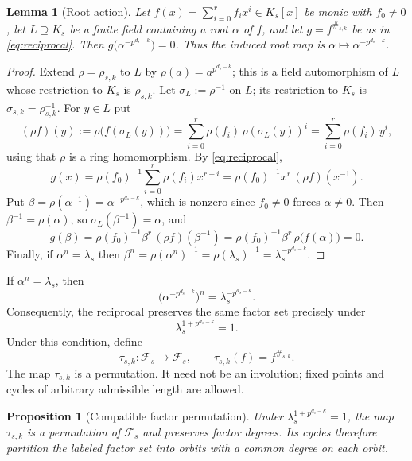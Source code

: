\documentclass[10pt,a4paper]{article}
\newcommand{\Fs}{\mathcal F_s}
\numberwithin{equation}{section}
\theoremstyle{plain}
\newtheorem{lemma}[theorem]{Lemma}
\newtheorem{proposition}[theorem]{Proposition}
\theoremstyle{definition}
\theoremstyle{remark}
\begin{document}
\begin{lemma}[Root action]\label{lem:root-action}
Let $f(x)=\sum_{i=0}^{r}f_ix^{i}\in K_s[x]$ be monic with $f_0\neq0$, let
$L\supseteq K_s$ be a finite field containing a root $\alpha$ of $f$, and let
$g=f^{\#_{s,k}}$ be as in \eqref{eq:reciprocal}. Then
$g\bigl(\alpha^{-p^{d_s-k}}\bigr)=0$. Thus the induced root map is
$\alpha\mapsto\alpha^{-p^{d_s-k}}$.
\end{lemma}

\begin{proof}
Extend $\rho=\rho_{s,k}$ to $L$ by $\rho(a)=a^{p^{d_s-k}}$; this is a field
automorphism of $L$ whose restriction to $K_s$ is $\rho_{s,k}$. Let
$\sigma_L:=\rho^{-1}$ on $L$; its restriction to $K_s$ is
$\sigma_{s,k}=\rho_{s,k}^{-1}$. For $y\in L$ put
\[
(\rho f)(y):=\rho\bigl(f(\sigma_L(y))\bigr)
 =\sum_{i=0}^{r}\rho(f_i)\,\rho(\sigma_L(y))^{i}
 =\sum_{i=0}^{r}\rho(f_i)\,y^{i},
\]
using that $\rho$ is a ring homomorphism. By \eqref{eq:reciprocal},
\[
g(x)=\rho(f_0)^{-1}\sum_{i=0}^{r}\rho(f_i)x^{r-i}
 =\rho(f_0)^{-1}x^{r}\,(\rho f)(x^{-1}).
\]
Put $\beta=\rho(\alpha^{-1})=\alpha^{-p^{d_s-k}}$, which is nonzero since
$f_0\ne0$ forces $\alpha\ne0$. Then $\beta^{-1}=\rho(\alpha)$, so
$\sigma_L(\beta^{-1})=\alpha$, and
\[
g(\beta)=\rho(f_0)^{-1}\beta^{r}\,(\rho f)(\beta^{-1})
 =\rho(f_0)^{-1}\beta^{r}\,\rho\bigl(f(\alpha)\bigr)=0.
\]
Finally, if $\alpha^{n}=\lambda_s$ then
$\beta^{n}=\rho(\alpha^{n})^{-1}=\rho(\lambda_s)^{-1}=\lambda_s^{-p^{d_s-k}}$.
\end{proof}

If $\alpha^n=\lambda_s$, then
\[
\bigl(\alpha^{-p^{d_s-k}}\bigr)^n=\lambda_s^{-p^{d_s-k}} .
\]
Consequently, the reciprocal preserves the same factor set precisely under
\begin{equation}\label{eq:compat}
\lambda_s^{1+p^{d_s-k}}=1 .
\end{equation}
Under this condition, define
\[
\tau_{s,k}:\Fs\longrightarrow\Fs,
\qquad
\tau_{s,k}(f)=f^{\#_{s,k}} .
\]
The map $\tau_{s,k}$ is a permutation. It need not be an involution; fixed points
and cycles of arbitrary admissible length are allowed.

\begin{proposition}[Compatible factor permutation]\label{prop:compatible-permutation}
Under $\lambda_s^{1+p^{d_s-k}}=1$, the map $\tau_{s,k}$ is a permutation of $\Fs$
and preserves factor degrees. Its cycles therefore partition the labeled factor
set into orbits with a common degree on each orbit.
\end{proposition}
\end{document}
